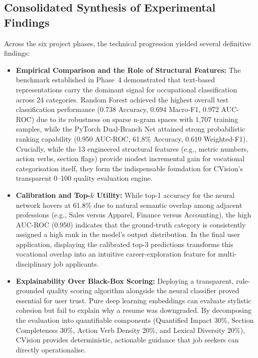 \documentclass[11pt,a4paper]{article}
\begin{document}
\subsection{Consolidated Synthesis of Experimental Findings}
\label{sec:synthesis_findings}

Across the six project phases, the technical progression yielded several definitive
findings:

\begin{itemize}
  \item \textbf{Empirical Comparison and the Role of Structural Features:} The
  benchmark established in Phase~4 demonstrated that text-based representations
  carry the dominant signal for occupational classification across 24 categories.
  Random Forest achieved the highest overall test classification performance
  (0.738 Accuracy, 0.694 Macro-F1, 0.972 AUC-ROC) due to its robustness on sparse
  n-gram spaces with 1{,}707 training samples, while the PyTorch Dual-Branch Net
  attained strong probabilistic ranking capability (0.950 AUC-ROC, 61.8\% Accuracy,
  0.610 Weighted-F1). Crucially, while the 13 engineered structural features (e.g.,
  metric numbers, action verbs, section flags) provide modest incremental gain for
  vocational categorisation itself, they form the indispensable foundation for
  CVision's transparent 0--100 quality evaluation engine.
  \item \textbf{Calibration and Top-$k$ Utility:} While top-1 accuracy for the neural
  network hovers at 61.8\% due to natural semantic overlap among adjacent professions
  (e.g., Sales versus Apparel, Finance versus Accounting), the high AUC-ROC (0.950)
  indicates that the ground-truth category is consistently assigned a high rank in the
  model's output distribution. In the final user application, displaying the calibrated
  top-3 predictions transforms this vocational overlap into an intuitive career-exploration
  feature for multi-disciplinary job applicants.
  \item \textbf{Explainability Over Black-Box Scoring:} Deploying a transparent,
  rule-grounded quality scoring algorithm alongside the neural classifier proved
  essential for user trust. Pure deep learning embeddings can evaluate stylistic
  cohesion but fail to explain why a resume was downgraded. By decomposing the
  evaluation into quantifiable components (Quantified Impact 30\%, Section Completeness
  30\%, Action Verb Density 20\%, and Lexical Diversity 20\%), CVision provides
  deterministic, actionable guidance that job seekers can directly operationalise.
\end{itemize}
\end{document}
